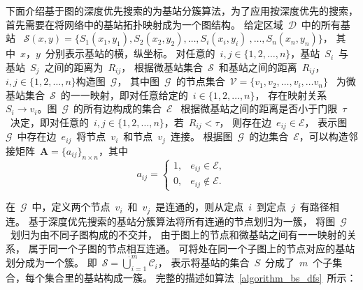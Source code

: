 下面介绍基于图的深度优先搜索的为基站分簇算法，为了应用按深度优先的搜索，首先需要在将网络中的基站拓扑映射成为一个图结构。
给定区域~$\mathcal{D}$~中的所有基站
~$\mathcal{S}(x,y)=\{S_1(x_1,y_1), S_2(x_2,y_2),\dots,S_i(x_i,y_i)~,\dots,S_n(x_n,y_n)\}$，
其中~$x$，$y$~分别表示基站的横，纵坐标。
对任意的~$i,j\in\{1,2,\dots,n\}$，基站~$S_i$~与基站~$S_j$~之间的距离为~$R_{ij}$，
根据微基站集合~$\mathcal{S}$~和基站之间的距离~$R_{ij}$，$i,j \in\{1,2,\dots,n\}$构造图~$\mathcal{G}$，
其中图~$\mathcal{G}$~的节点集合~$\mathcal{V}=\{v_1,v_2,\dots,v_i,\dots v_n\}$~
为微基站集合~$\mathcal{S}$~的一一映射，即对任意给定的~$i\in\{1,2,\dots,n\}$，
存在映射关系~$S_i \rightarrow v_i$。图~$\mathcal{G}$~的所有边构成的集合~$\mathcal{E}$~
根据微基站之间的距离是否小于门限~$\tau$~决定，即对任意的~$i,j\in\{1,2,\dots,n\}$，若~$R_{ij}<\tau$，
则存在边~$e_{ij}\in\mathcal{E}$，
表示图~$\mathcal{G}$~中存在边~$e_{ij}$~将节点~$v_i$~和节点~$v_j$~连接。
根据图~$\mathcal{G}$~的边集合~$\mathcal{E}$，可以构造邻接矩阵~$\mathbf{A}=\{a_{ij}\}_{n\times n}$，其中
\begin{equation}
a_{ij}=
\begin{cases}
1, & e_{ij}\in \mathcal{E}, \\
0, & e_{ij}\notin \mathcal{E}.
\end{cases}
\end{equation}

在~$\mathcal{G}$~中，定义两个节点~$v_i$~和~$v_j$~是连通的，则从定点~$i$~到定点~$j$~有路径相连。
基于深度优先搜索的基站分簇算法将所有连通的节点划归为一簇，
将图~$\mathcal{G}$~划归为由不同子图构成的不交并，
由于图上的节点和微基站之间有一一映射的关系，
属于同一个子图的节点相互连通。
可将处在同一个子图上的节点对应的基站划分成为一个簇。
即~$\mathcal{S} = \dot{\bigcup\nolimits}_{i=1}^{m}\mathcal{C}_i$，
表示将基站的集合~$S$~分成了~$m$~个子集合，每个集合里的基站构成一簇。
完整的描述如算法~\ref{algorithm_bs_dfs}~所示：

